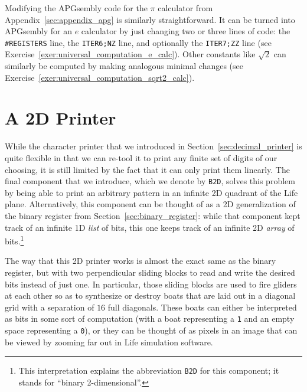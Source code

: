 Modifying the APGsembly code for the $\pi$ calculator from Appendix~\ref{sec:appendix_apg} is similarly straightforward. It can be turned into APGsembly for an $e$ calculator by just changing two or three lines of code: the \texttt{\#REGISTERS} line, the \texttt{ITER6;NZ} line, and optionally the \texttt{ITER7;ZZ} line (see Exercise~\ref{exer:universal_computation_e_calc}). Other constants like $\sqrt{2}$ can similarly be computed by making analogous minimal changes (see Exercise~\ref{exer:universal_computation_sqrt2_calc}).



\section{A 2D Printer}\label{sec:2dprinter}

While the character printer that we introduced in Section~\ref{sec:decimal_printer} is quite flexible in that we can re-tool it to print any finite set of digits of our choosing, it is still limited by the fact that it can only print them linearly. The final component that we introduce, which we denote by \texttt{B2D}, solves this problem by being able to print an arbitrary pattern in an infinite 2D quadrant of the Life plane. Alternatively, this component can be thought of as a 2D generalization of the binary register from Section~\ref{sec:binary_register}: while that component kept track of an infinite 1D \emph{list} of bits, this one keeps track of an infinite 2D \emph{array} of bits.\footnote{This interpretation explains the abbreviation \texttt{B2D} for this component; it stands for ``binary 2-dimensional''.}

The way that this 2D printer works is almost the exact same as the binary register, but with two perpendicular sliding blocks to read and write the desired bits instead of just one. In particular, those sliding blocks are used to fire gliders at each other so as to synthesize or destroy boats that are laid out in a diagonal grid with a separation of $16$ full diagonals. These boats can either be interpreted as bits in some sort of computation (with a boat representing a \texttt{1} and an empty space representing a \texttt{0}), or they can be thought of as pixels in an image that can be viewed by zooming far out in Life simulation software.

